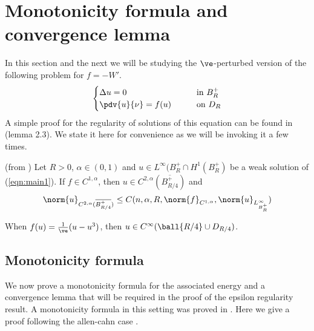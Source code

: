\section{Monotonicity formula and convergence lemma}
In this section and the next we will be studying the $\ve$-perturbed version of the following problem for $f=-W'$.
\begin{equation} \label{eqn:main1}
        \begin{cases}
            \Delta u = 0 \qquad &\text{in } B_R^+ \\
            \pdv{u}{\nu} = f(u) \qquad  &\text{on  } D_R
        \end{cases}
\end{equation}
A simple proof for the regularity of solutions of this equation can be found in \cite{csm}(lemma 2.3). We state it here for convenience as we will be invoking it a few times. 
\begin{theo}(from \cite{csm})
    Let $R>0$, $\alpha \in (0,1)$ and $u \in L^{\infty}(B^+_{R} \cap H^1(B^+_R)$ be a weak solution of (\ref{eqn:main1}). If $f \in C^{1,\alpha}$, then $u \in C^{2,\alpha}(\overline{B^+_{R/4}})$ and 
    \begin{equation} \label{csmest}
        \norm{u}_{C^{2,\alpha}(\overline{B^+_{R/4}})} \leq C(n,\alpha,R,\norm{f}_{C^{1,\alpha}},\norm{u}_{L^{\infty}_{B_R^+}})
    \end{equation}
\end{theo}
\begin{coro}
    When $f(u)= \frac{1}{\ve}(u-u^3)$, then $u \in C^{\infty}(\ball {R/4} \cup D_{R/4})$.
\end{coro}





\subsection{Monotonicity formula}We now prove a monotonicity formula for the associated energy and a convergence lemma that will be required in the proof of the epsilon regularity result. A monotonicity formula in this setting was proved in \cite{ms}. Here we give a proof following the allen-cahn case \cite{ht}.

